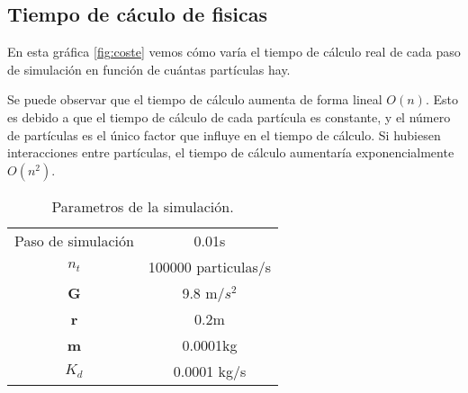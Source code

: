\documentclass{article}
\begin{document}
\subsection{Tiempo de cáculo de fisicas}
En esta gráfica \ref{fig:coste} vemos cómo varía el tiempo de cálculo real de cada paso de simulación en función de cuántas partículas hay.

Se puede observar que el tiempo de cálculo aumenta de forma lineal $O(n)$. Esto es debido a que el tiempo de cálculo de cada partícula es constante, y el número de partículas es el único factor que influye en el tiempo de cálculo. Si hubiesen interacciones entre partículas, el tiempo de cálculo aumentaría exponencialmente $O(n^2)$.

\begin{table}[h]
    \centering
    \begin{tabular}{cc}
        Paso de simulación & 0.01s               \\
        \textbf{$n_t$}     & 100000 particulas/s \\
        \textbf{G}         & 9.8 m/$s^2$         \\
        \textbf{r}         & 0.2m                \\
        \textbf{m}         & 0.0001kg            \\
        \textbf{$K_d$}     & 0.0001 kg/s         \\
    \end{tabular}
    \caption{Parametros de la simulación.}
    \label{tab:parametros_1}
\end{table}
\end{document}

